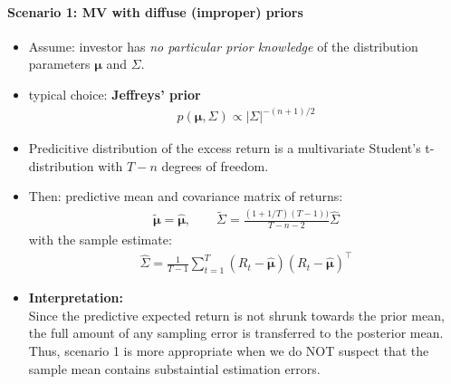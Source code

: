 \documentclass[a4paper,landscape,8pt,fleqn]{scrartcl}
\renewcommand{\emph}[1]{\textbf{#1}}
\begin{document}
\begin{multicols*}{3}
\paragraph{Scenario 1: MV with diffuse (improper) priors}
\begin{itemize}
\item Assume: investor has \textit{no particular prior knowledge} of the distribution parameters $\bm \mu$ and $\Sigma$.
\item typical choice: \emph{Jeffreys' prior}
\begin{align*}
p(\bm \mu, \Sigma) \propto |\Sigma|^{-(n+1)/2}
\end{align*}
\item Predicitive distribution of the excess return is a multivariate Student's t-distribution with $T-n$ degrees of freedom.
\item Then: predictive mean and covariance matrix of returns:
\begin{align*}
\bm{\tilde \mu} = \bm{\hat \mu}, \qquad \tilde \Sigma = \frac{(1+1/T)(T-1))}{T-n-2} \hat \Sigma
\end{align*}
with the sample estimate:
\begin{align*}
\hat \Sigma = \frac{1}{T-1} \sum_{t=1}^T (R_t - \bm{\hat \mu}) (R_t - \bm{\hat \mu})^\top
\end{align*}
\item \emph{Interpretation:} \\
Since the predictive expected return is not shrunk towards the prior mean, the full amount of any sampling error is transferred to the posterior mean. \\
Thus, scenario 1 is more appropriate when we do NOT suspect that the sample mean contains substaintial estimation errors.
\end{itemize}


\end{multicols*}
\end{document}
